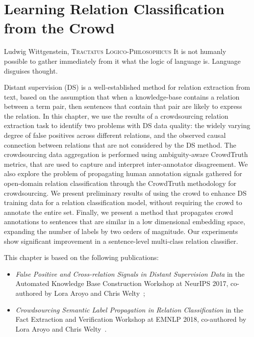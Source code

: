 \chapter{Learning Relation Classification from the Crowd}
\label{chap:od-rel-ex}

\begin{chapquote}{Ludwig Wittgenstein, \textsc{Tractatus Logico-Philosophicus}}
It is not humanly possible to gather immediately from it what the logic of language is. Language disguises thought.
\end{chapquote}

Distant supervision (DS) is a well-established method for relation extraction from text, based on the assumption that when a knowledge-base contains a relation between a term pair, then sentences that contain that pair are likely to express the relation. In this chapter, we use the results of a crowdsourcing relation extraction task to identify two problems with DS data quality: the widely varying degree of false positives across different relations, and the observed causal connection between relations that are not considered by the DS method. The crowdsourcing data aggregation is performed using ambiguity-aware CrowdTruth metrics, that are used to capture and interpret inter-annotator disagreement. We also explore the problem of propagating human annotation signals gathered for open-domain relation classification through the CrowdTruth methodology for crowdsourcing. We present preliminary results of using the crowd to enhance DS training data for a relation classification model, without requiring the crowd to annotate the entire set. Finally, we present a method that propagates crowd annotations to sentences that are similar in a low dimensional embedding space, expanding the number of labels by two orders of magnitude. Our experiments show significant improvement in a sentence-level multi-class relation classifier.

This chapter is based on the following publications:

\begin{itemize}

\item \textit{False Positive and Cross-relation Signals in Distant Supervision Data} in the Automated Knowledge Base Construction Workshop at NeurIPS 2017, co-authored by Lora Aroyo and Chris Welty~\cite{dumitrache2017false};

\item \textit{Crowdsourcing Semantic Label Propagation in Relation Classification} in the Fact Extraction and Verification Workshop at EMNLP 2018, co-authored by Lora Aroyo and Chris Welty~\cite{dumitrache2018crowdsourcing}.

\end{itemize}

